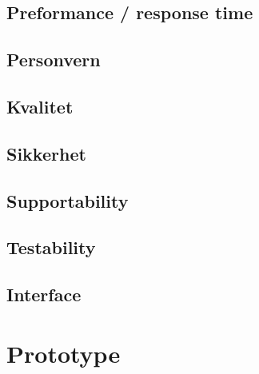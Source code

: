 \documentclass[12pt]{article}
\begin{document}
    \subsection{Preformance / response time}


    \subsection{Personvern}


    \subsection{Kvalitet}


    \subsection{Sikkerhet}


    \subsection{Supportability}


    \subsection{Testability}
        
    \subsection{Interface}

%
%

\section{Prototype}
\end{document}

